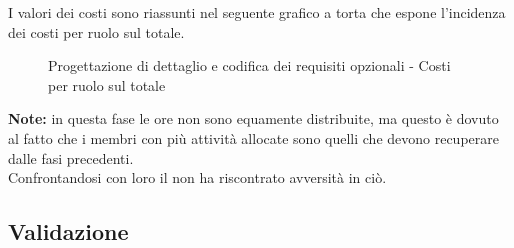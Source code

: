 				\noindent
				I valori dei costi sono riassunti nel seguente grafico a torta che espone l’incidenza dei costi per ruolo sul totale.
				\begin{center}
					\begin{figure}[htbp]
					\vspace{0.8cm}
					\caption{Progettazione di dettaglio e codifica dei requisiti opzionali - Costi per ruolo sul totale}
					\end{figure}
				\end{center}
		\noindent
		\textbf{Note:} in questa fase le ore non sono equamente distribuite, ma questo è dovuto al fatto che i membri con più attività allocate sono quelli che devono recuperare dalle fasi precedenti. \\
		Confrontandosi con loro il \roleProjectManager{} non ha riscontrato avversità in ciò.
	
	\newpage
	\subsection{Validazione} %
	\label{sub:validazione}
